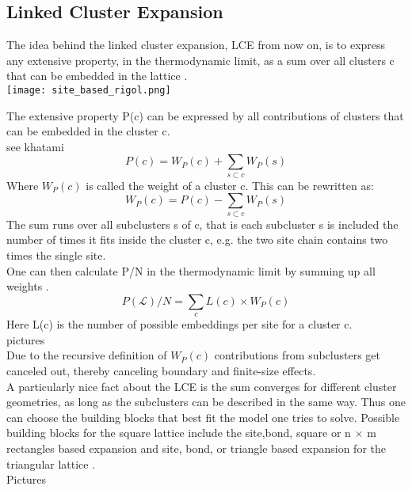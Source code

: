 \documentclass{article}
\begin{document}
\subsection{Linked Cluster Expansion}
The idea behind the linked cluster expansion, LCE from now on, is to
express any extensive property, in the thermodynamic limit, as a sum
over all clusters c that can be embedded in the lattice
\cite{Rigol}.\\

\texttt{[image: site\_based\_rigol.png]}

The extensive property P(c) can be expressed by all contributions of
clusters that can be embedded in the cluster c.\\
see khatami\\
\begin{equation}
\label{eq:9}
P(c) = W_P(c) + \sum\limits_{s \subset c} W_P(s)
\end{equation}
Where $W_P(c)$ is called the weight of a cluster c.
This can be rewritten as:
\begin{equation}
\label{eq:4}
W_P(c) = P(c) - \sum\limits_{s \subset c} W_P(s)
\end{equation}
The sum runs over all subclusters s of c, that is each subcluster s is
included the number of times it fits inside the cluster c, e.g. the
two site chain contains two times the single site.\\
One can then calculate P/N in the thermodynamic limit by summing up
all weights \cite{Rigol}.
\begin{equation}
\label{eq:3}
P(\mathcal{L})/N = \sum\limits_c L(c) \times W_P(c)
\end{equation}
Here L(c) is the number of possible embeddings per site for a cluster
c.\\
pictures\\
Due to the recursive definition of $W_P(c)$ contributions from
subclusters get canceled out, thereby canceling boundary and finite-size effects.\\
A particularly nice fact about the LCE is the sum converges for
different cluster geometries, as long as the subclusters can be
described in the same way. Thus one can choose the
building blocks that best fit the model one tries to solve. Possible building blocks for the square
lattice include the site,bond, square or n
$\times$ m rectangles based expansion and site, bond, or triangle
based expansion for the triangular lattice \cite{Rigol,Kallin}.\\
Pictures\\
\end{document}
